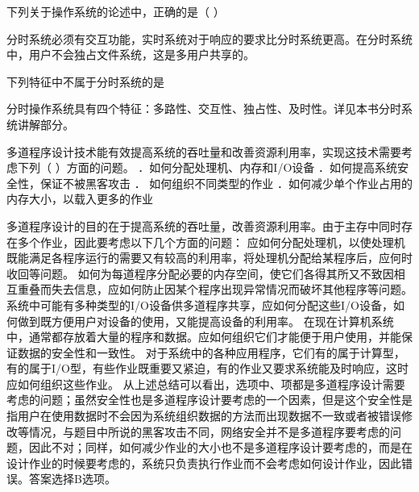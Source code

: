 \question 下列关于操作系统的论述中，正确的是（ ）
\par{}
\begin{solution}分时系统必须有交互功能，实时系统对于响应的要求比分时系统更高。在分时系统中，用户不会独占文件系统，这是多用户共享的。
\end{solution}
\question 下列特征中不属于分时系统的是
\par{}
\begin{solution}分时操作系统具有四个特征：多路性、交互性、独占性、及时性。详见本书分时系统讲解部分。
\end{solution}
\question 多道程序设计技术能有效提高系统的吞吐量和改善资源利用率，实现这技术需要考虑下列（
）方面的问题。 ．如何分配处理机、内存和I/O设备
．如何提高系统安全性，保证不被黑客攻击 ． 如何组织不同类型的作业
．如何减少单个作业占用的内存大小，以载入更多的作业
\par{}
\begin{solution}多道程序设计的目的在于提高系统的吞吐量，改善资源利用率。由于主存中同时存在多个作业，因此要考虑以下几个方面的问题：
应如何分配处理机，以使处理机既能满足各程序运行的需要又有较高的利用率，将处理机分配给某程序后，应何时收回等问题。
如何为每道程序分配必要的内存空间，使它们各得其所又不致因相互重叠而失去信息，应如何防止因某个程序出现异常情况而破坏其他程序等问题。
系统中可能有多种类型的I/O设备供多道程序共享，应如何分配这些I/O设备，如何做到既方便用户对设备的使用，又能提高设备的利用率。
在现在计算机系统中，通常都存放着大量的程序和数据。应如何组织它们才能便于用户使用，并能保证数据的安全性和一致性。
对于系统中的各种应用程序，它们有的属于计算型，有的属于I/O型，有些作业既重要又紧迫，有的作业又要求系统能及时响应，这时应如何组织这些作业。
从上述总结可以看出，选项中、项都是多道程序设计需要考虑的问题；虽然安全性也是多道程序设计要考虑的一个因素，但是这个安全性是指用户在使用数据时不会因为系统组织数据的方法而出现数据不一致或者被错误修改等情况，与题目中所说的黑客攻击不同，网络安全并不是多道程序要考虑的问题，因此不对；同样，如何减少作业的大小也不是多道程序设计要考虑的，而是在设计作业的时候要考虑的，系统只负责执行作业而不会考虑如何设计作业，因此错误。答案选择B选项。
\end{solution}
